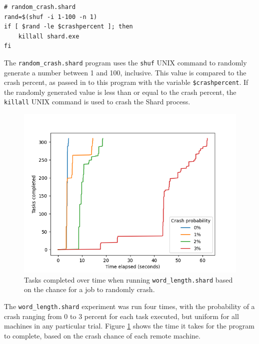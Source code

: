 \documentclass[oneside]{report}
\begin{document}
\begin{minipage}[c]{\textwidth-15pt}
  \begin{lstlisting}[language=Shard]
# random_crash.shard
rand=$(shuf -i 1-100 -n 1)
if [ $rand -le $crashpercent ]; then
    killall shard.exe
fi
\end{lstlisting}
  \smallskip
\end{minipage}

The \texttt{random\_crash.shard} program uses the \texttt{shuf} UNIX command to randomly generate a number between 1 and 100, inclusive.
This value is compared to the crash percent, as passed in to this program with the variable \texttt{\$crashpercent}.
If the randomly generated value is less than or equal to the crash percent, the \texttt{killall} UNIX command is used to crash the Shard process.

\begin{figure}[h]
  \begin{center}
    \includegraphics[scale=0.9]{img/experiments/e6_1620960581241.png}
    \caption{Tasks completed over time when running \texttt{word\_length.shard} based on the chance for a job to randomly crash.}
    \label{fig:crashwordlength}
  \end{center}
\end{figure}

The \texttt{word\_length.shard} experiment was run four times, with the probability of a crash ranging from 0 to 3 percent for each task executed, but uniform for all machines in any particular trial.
Figure \ref{fig:crashwordlength} shows the time it takes for the program to complete, based on the crash chance of each remote machine.
\end{document}

